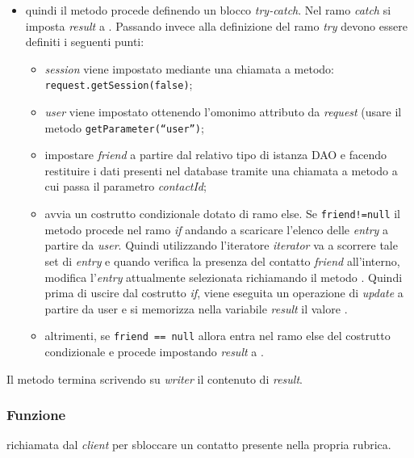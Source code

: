 \begin{description}
\begin{itemize}
		\item quindi il metodo procede definendo un blocco \textit{try-catch}. Nel ramo \textit{catch} si imposta \textit{result} a . Passando invece alla definizione del ramo \textit{try} devono essere definiti i seguenti punti:
		\begin{itemize}
			\item \textit{session} viene impostato mediante una chiamata a metodo:
			\verb|request.getSession(false)|;
			\item \textit{user} viene impostato ottenendo l'omonimo attributo da \textit{request} (usare il metodo \texttt{getParameter(``user'')};
			\item impostare \textit{friend} a partire dal relativo tipo di istanza DAO e facendo restituire i dati presenti nel database tramite una chiamata a metodo  a cui passa il parametro \textit{contactId};
			\item avvia un costrutto condizionale dotato di ramo else. Se \texttt{friend!=null} il metodo procede nel ramo \textit{if} andando a scaricare l'elenco delle \textit{entry} a partire da \textit{user}. Quindi utilizzando l'iteratore \textit{iterator} va a scorrere tale set di \textit{entry} e quando verifica la presenza del contatto \textit{friend} all'interno, modifica l'\textit{entry} attualmente selezionata richiamando il metodo . Quindi prima di uscire dal costrutto \textit{if}, viene eseguita un operazione di \textit{update} a partire da user e si memorizza nella variabile \textit{result} il valore .
			\item altrimenti, se \texttt{friend == null} allora entra nel ramo else del costrutto condizionale e procede impostando \textit{result} a .
		\end{itemize}
	\end{itemize}
	Il metodo termina scrivendo su \textit{writer} il contenuto di \textit{result}.
	
\end{description}



\subsubsection*{Funzione}
 richiamata dal \textit{client} per sbloccare un contatto presente nella propria rubrica.

